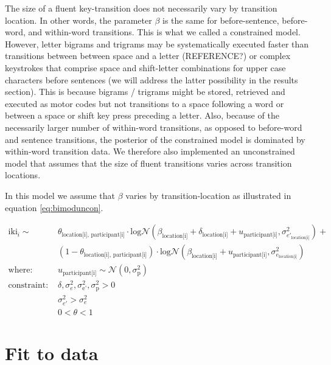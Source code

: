\documentclass[
  man,floatsintext]{apa7}
\begin{document}
The size of a fluent key-transition does not necessarily vary by transition location. In other words, the parameter \(\beta\) is the same for before-sentence, before-word, and within-word transitions. This is what we called a constrained model. However, letter bigrams and trigrams may be systematically executed faster than transitions between between space and a letter (REFERENCE?) or complex keystrokes that comprise space and shift-letter combinations for upper case characters before sentences (we will address the latter possibility in the results section). This is because bigrams / trigrams might be stored, retrieved and executed as motor codes but not transitions to a space following a word or between a space or shift key press preceding a letter. Also, because of the necessarily larger number of within-word transitions, as opposed to before-word and sentence transitions, the posterior of the constrained model is dominated by within-word transition data. We therefore also implemented an unconstrained model that assumes that the size of fluent transitions varies across transition locations.

In this model we assume that \(\beta\) varies by transition-location as illustrated in equation \ref{eq:bimoduncon}.

\begin{equation}
\begin{aligned}
\label{eq:bimoduncon}
\text{iki}_{i} \sim\text{ } & \theta_\text{location[i], participant[i]} \cdot \text{log}\mathcal{N}(\beta_\text{location[i]} + \delta_\text{location[i]} + u_\text{participant[i]}, \sigma_{e'_\text{location[i]}}^2) + \\
  & (1 - \theta_\text{location[i], participant[i]}) \cdot \text{log}\mathcal{N}(\beta_\text{location[i]} + u_\text{participant[i]}, \sigma_{e_\text{location[i]}}^2)\\
    \text{where: }  & u_\text{participant[i]} \sim \mathcal{N}(0, \sigma_\text{p}^2) \\
\text{constraint: } & \delta, \sigma_{e}^2, \sigma_\text{e'}^2, \sigma_\text{p}^2>0\\
        & \sigma_{e'}^2 > \sigma_{e}^2\\
        & 0 < \theta < 1
\end{aligned}
\end{equation}

\newpage

\hypertarget{fit-to-data}{%
\section{Fit to data}\label{fit-to-data}}
\end{document}
